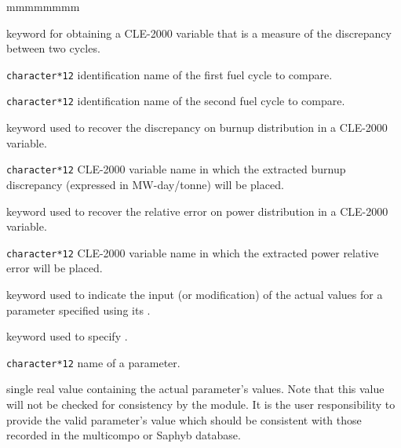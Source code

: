 \begin{ListeDeDescription}{mmmmmmmm}
\item[\moc{COMPARE}] keyword for obtaining a CLE-2000 variable that is a measure of the discrepancy between two
cycles.

\item[\dusa{hc1}] \texttt{character*12} identification name of the first fuel cycle to compare.

\item[\dusa{hc2}] \texttt{character*12} identification name of the second fuel cycle to compare.

\item[\moc{DIST-BURN}]  keyword used to recover the discrepancy on burnup distribution in a CLE-2000 variable.

\item[\dusa{epsburn}] \texttt{character*12} CLE-2000 variable name in which the extracted burnup discrepancy (expressed in MW-day/tonne) will be placed.

\item[\moc{DIST-POWR}]  keyword used to recover the relative error on power distribution in a CLE-2000 variable.

\item[\dusa{epspowr}] \texttt{character*12} CLE-2000 variable name in which the extracted power relative error will be placed.

\item[\moc{SET-PARAM}] keyword used to indicate the input (or modification)
of the actual values for a parameter specified using its .

\item[\moc{PNAME}] keyword used to specify .

\item[\dusa{PNAME}] \texttt{character*12} name of a parameter.

\item[\dusa{pvalue}] single real value containing the actual
parameter's values. Note that this value will not be checked for consistency
by the module. It is the user responsibility to provide the valid parameter's value
which should be consistent with those recorded in the multicompo or Saphyb database.

\end{ListeDeDescription}
\clearpage
